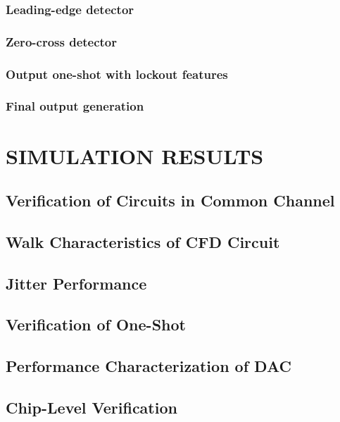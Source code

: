 \documentclass[12pt,oneside,final]{siuethesis}
\theoremstyle{definition}
\begin{document}
\subsection{Leading-edge detector}

\subsection{Zero-cross detector}


\subsection{Output one-shot with lockout features}

\subsection{Final output generation}



\chapter{SIMULATION RESULTS}

\section{Verification of Circuits in Common Channel}

\section{Walk Characteristics of CFD Circuit}

\section{Jitter Performance}

\section{Verification of One-Shot}

\section{Performance Characterization of DAC}

\section{Chip-Level Verification}
\end{document}
